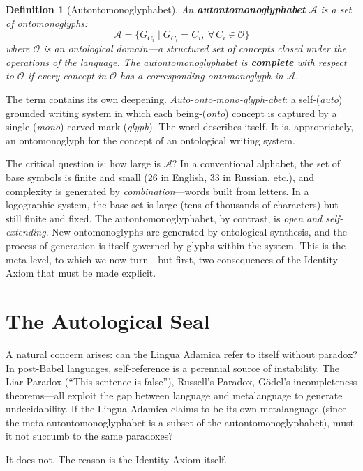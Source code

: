 \documentclass[12pt, letterpaper]{book}
\def\equiv{=}%
\newtheorem{definition}{Definition}[chapter]
\begin{document}
\begin{definition}[Autontomonoglyphabet]\label{def:alphabet}
An \textbf{autontomonoglyphabet} $\mathcal{A}$ is a set of ontomonoglyphs:
\[
\mathcal{A} = \{G_{C_i} \mid G_{C_i} \equiv C_i,\ \forall\, C_i \in \mathcal{O}\}
\]
where $\mathcal{O}$ is an ontological domain---a structured set of concepts closed under the operations of the language. The autontomonoglyphabet is \textbf{complete} with respect to $\mathcal{O}$ if every concept in $\mathcal{O}$ has a corresponding ontomonoglyph in $\mathcal{A}$.
\end{definition}

The term contains its own deepening. \textit{Auto-onto-mono-glyph-abet}: a self-(\textit{auto}) grounded writing system in which each being-(\textit{onto}) concept is captured by a single (\textit{mono}) carved mark (\textit{glyph}). The word describes itself. It is, appropriately, an ontomonoglyph for the concept of an ontological writing system.

The critical question is: how large is $\mathcal{A}$? In a conventional alphabet, the set of base symbols is finite and small (26 in English, 33 in Russian, etc.), and complexity is generated by \textit{combination}---words built from letters. In a logographic system, the base set is large (tens of thousands of characters) but still finite and fixed. The autontomonoglyphabet, by contrast, is \textit{open and self-extending}. New ontomonoglyphs are generated by ontological synthesis, and the process of generation is itself governed by glyphs within the system. This is the meta-level, to which we now turn---but first, two consequences of the Identity Axiom that must be made explicit.


\section{The Autological Seal}

A natural concern arises: can the Lingua Adamica refer to itself without paradox? In post-Babel languages, self-reference is a perennial source of instability. The Liar Paradox (``This sentence is false''), Russell's Paradox, G\"{o}del's incompleteness theorems---all exploit the gap between language and metalanguage to generate undecidability. If the Lingua Adamica claims to be its own metalanguage (since the meta-autontomonoglyphabet is a subset of the autontomonoglyphabet), must it not succumb to the same paradoxes?

It does not. The reason is the Identity Axiom itself.
\end{document}
